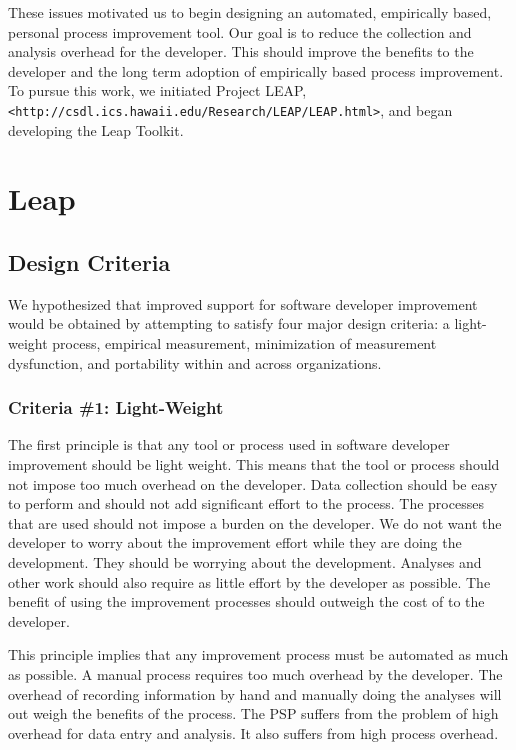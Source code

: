 These issues motivated us to begin designing an automated, empirically based,
personal process improvement tool.  Our goal is to reduce the collection and
analysis overhead for the developer.  This should improve the benefits to the
developer and the long term adoption of empirically based process improvement.
To pursue this work, we initiated Project LEAP, {\footnotesize {\tt
    <http://csdl.ics.hawaii.edu/Research/LEAP/LEAP.html>}}, and began
developing the Leap Toolkit.

\section{Leap}



\subsection{Design Criteria}

We hypothesized that improved support for software developer improvement would
be obtained by attempting to satisfy four major design criteria: a light-weight
process, empirical measurement, minimization of measurement dysfunction, and
portability within and across organizations.

\subsubsection{Criteria \#1: Light-Weight}

The first principle is that any tool or process used in software developer
improvement should be light weight.  This means that the tool or process should
not impose too much overhead on the developer.  Data collection should be easy
to perform and should not add significant effort to the process.  The processes
that are used should not impose a burden on the developer. We do not want the
developer to worry about the improvement effort while they are doing the
development.  They should be worrying about the development.  Analyses and
other work should also require as little effort by the developer as possible.
The benefit of using the improvement processes should outweigh the cost of to
the developer.

This principle implies that any improvement process must be automated as much
as possible.  A manual process requires too much overhead by the developer.
The overhead of recording information by hand and manually doing the analyses
will out weigh the benefits of the process.  The PSP suffers from the problem
of high overhead for data entry and analysis.  It also suffers from high
process overhead.

